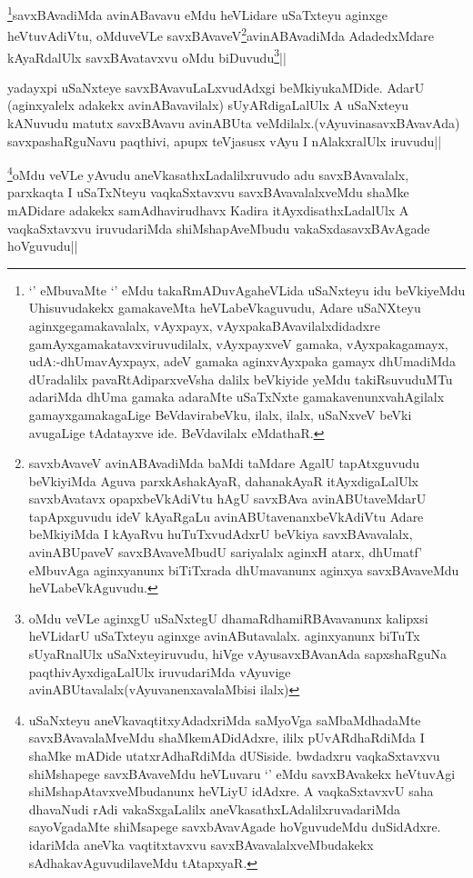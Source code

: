 \begin{artha}
\footnote{`\stext' eMbuvaMte `\stext' eMdu takaRmADuvAgaheVLida uSaNxteyu idu beVkiyeMdu Uhisuvudakekx gamakaveMta heVLabeVkaguvudu, Adare uSaNXteyu aginxgegamakavalalx, vAyxpayx, vAyxpakaBAvavilalxdidadxre gamAyxgamakatavxviruvudilalx, vAyxpayxveV gamaka, vAyxpakagamayx, udA:-dhUmavAyxpayx, adeV gamaka aginxvAyxpaka gamayx dhUmadiMda dUradalilx pavaRtAdiparxveVsha dalilx beVkiyide yeMdu takiRsuvuduMTu adariMda dhUma gamaka adaraMte uSaTxNxte gamakavenunxvahAgilalx gamayxgamakagaLige BeVdavirabeVku, ilalx, ilalx, uSaNxveV beVki avugaLige tAdatayxve ide. BeVdavilalx eMdathaR.}savxBAvadiMda avinABavavu eMdu heVLidare uSaTxteyu aginxge heVtuvAdiVtu, oMduveVLe savxBAvaveV\footnote{savxbAvaveV avinABAvadiMda baMdi taMdare AgalU tapAtxguvudu beVkiyiMda Aguva parxkAshakAyaR, dahanakAyaR itAyxdigaLalUlx savxbAvatavx opapxbeVkAdiVtu hAgU savxBAva avinABUtaveMdarU tapApxguvudu ideV kAyaRgaLu avinABUtavenanxbeVkAdiVtu Adare beMkiyiMda I kAyaRvu huTuTxvudAdxrU beVkiya savxBAvavalalx, avinABUpaveV savxBAvaveMbudU sariyalalx aginxH atarx, dhUmatf' eMbuvAga aginxyanunx biTiTxrada dhUmavanunx aginxya savxBAvaveMdu heVLabeVkAguvudu.}avinABAvadiMda AdadedxMdare kAyaRdalUlx savxBAvatavxvu oMdu biDuvudu\footnote{oMdu veVLe aginxgU uSaNxtegU dhamaRdhamiRBAvavanunx kalipxsi heVLidarU uSaTxteyu aginxge avinAButavalalx. aginxyanunx biTuTx sUyaRnalUlx uSaNxteyiruvudu, hiVge vAyusavxBAvanAda sapxshaRguNa paqthivAyxdigaLalUlx iruvudariMda vAyuvige avinABUtavalalx(vAyuvanenxavalaMbisi ilalx)}||
\end{artha}

\begin{artha}
yadayxpi uSaNxteye savxBAvavuLaLxvudAdxgi beMkiyukaMDide. AdarU (aginxyalelx adakekx avinABavavilalx) sUyARdigaLalUlx A uSaNxteyu kANuvudu matutx savxBAvavu avinABUta veMdilalx.(vAyuvinasavxBAvavAda) savxpashaRguNavu paqthivi, apupx teVjasusx vAyu I nAlakxralUlx iruvudu||
\end{artha}

\begin{artha}
\footnote{uSaNxteyu aneVkavaqtitxyAdadxriMda saMyoVga saMbaMdhadaMte savxBAvavalaMveMdu shaMkemADidAdxre, ililx pUvARdhaRdiMda I shaMke mADide utatxrAdhaRdiMda dUSiside. bwdadxru vaqkaSxtavxvu shiMshapege savxBAvaveMdu heVLuvaru `\stext' eMdu savxBAvakekx heVtuvAgi shiMshapAtavxveMbudanunx heVLiyU idAdxre. A vaqkaSxtavxvU saha dhavaNudi rAdi vakaSxgaLalilx aneVkasathxLAdalilxruvadariMda sayoVgadaMte shiMsapege savxbAvavAgade hoVguvudeMdu duSidAdxre. idariMda aneVka vaqtitxtavxvu savxBAvavalalxveMbudakekx sAdhakavAguvudilaveMdu tAtapxyaR.}oMdu veVLe yAvudu aneVkasathxLadalilxruvudo adu savxBAvavalalx, parxkaqta I uSaTxNteyu vaqkaSxtavxvu savxBAvavalalxveMdu shaMke mADidare adakekx samAdhavirudhavx Kadira itAyxdisathxLadalUlx A vaqkaSxtavxvu iruvudariMda shiMshapAveMbudu vakaSxdasavxBAvAgade hoVguvudu||
\end{artha}


